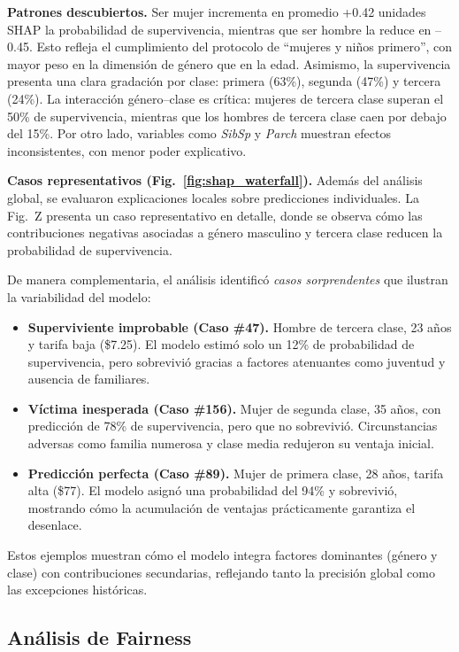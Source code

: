 \documentclass[conference]{IEEEtran}
\begin{document}
\textbf{Patrones descubiertos.}
Ser mujer incrementa en promedio +0.42 unidades SHAP la probabilidad de supervivencia, mientras que ser hombre la reduce en --0.45. Esto refleja el cumplimiento del protocolo de ``mujeres y niños primero'', con mayor peso en la dimensión de género que en la edad. Asimismo, la supervivencia presenta una clara gradación por clase: primera (63\%), segunda (47\%) y tercera (24\%). La interacción género--clase es crítica: mujeres de tercera clase superan el 50\% de supervivencia, mientras que los hombres de tercera clase caen por debajo del 15\%. Por otro lado, variables como \textit{SibSp} y \textit{Parch} muestran efectos inconsistentes, con menor poder explicativo. 

\textbf{Casos representativos (Fig.~\ref{fig:shap_waterfall}).}
Además del análisis global, se evaluaron explicaciones locales sobre predicciones individuales. La Fig.~Z presenta un caso representativo en detalle, donde se observa cómo las contribuciones negativas asociadas a género masculino y tercera clase reducen la probabilidad de supervivencia. 

De manera complementaria, el análisis identificó \textit{casos sorprendentes} que ilustran la variabilidad del modelo:
\begin{itemize}
    \item \textbf{Superviviente improbable (Caso \#47).} Hombre de tercera clase, 23 años y tarifa baja (\$7.25). El modelo estimó solo un 12\% de probabilidad de supervivencia, pero sobrevivió gracias a factores atenuantes como juventud y ausencia de familiares.
    \item \textbf{Víctima inesperada (Caso \#156).} Mujer de segunda clase, 35 años, con predicción de 78\% de supervivencia, pero que no sobrevivió. Circunstancias adversas como familia numerosa y clase media redujeron su ventaja inicial.
    \item \textbf{Predicción perfecta (Caso \#89).} Mujer de primera clase, 28 años, tarifa alta (\$77). El modelo asignó una probabilidad del 94\% y sobrevivió, mostrando cómo la acumulación de ventajas prácticamente garantiza el desenlace.
\end{itemize}

Estos ejemplos muestran cómo el modelo integra factores dominantes (género y clase) con contribuciones secundarias, reflejando tanto la precisión global como las excepciones históricas.

\subsection{Análisis de Fairness}
\end{document}
